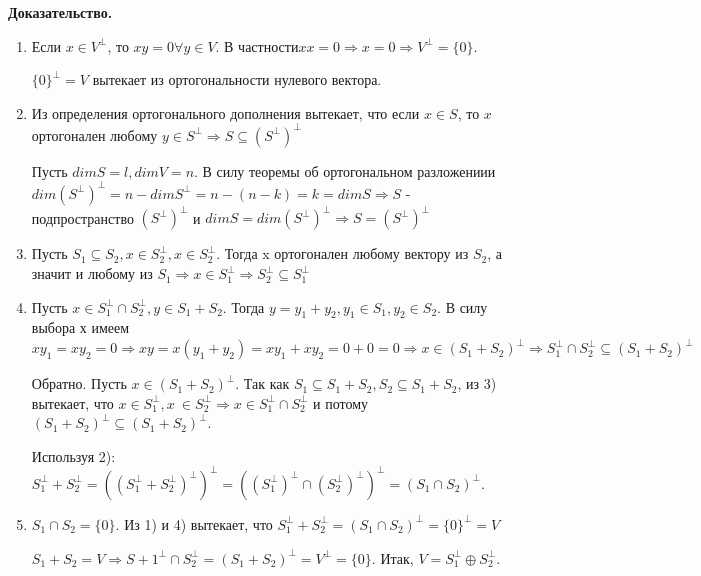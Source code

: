 \documentclass[a4paper]{article}
\begin{document}
    \begin{hproof}
        \textbf{Доказательство.}
        \begin{enumerate}
            \item Если $x \in V^{\bot}$, то $xy = 0 \forall y \in V$. В частности$xx = 0\Rightarrow x = 0 \Rightarrow V^{\bot} = \{ 0 \}$.

            $\{ 0 \}^{\bot} = V$ вытекает из ортогональности нулевого вектора.

            \item Из определения ортогонального дополнения вытекает, что если $x \in S$, то $x$ ортогонален любому $y \in S^{\bot} \Rightarrow S \subseteq (S^{\bot})^{\bot}$

            Пусть $dimS = l, dimV = n$. В силу теоремы об ортогональном разложениии $dim (S^{\bot})^{\bot} = n - dim S^{\bot} = n-(n-k) = k = dimS \Rightarrow S$ - подпространство $(S^{\bot})^{\bot}$ и $dimS = dim (S^{\bot})^{\bot} \Rightarrow S = (S^{\bot})^{\bot}$

            \item Пусть $S_1 \subseteq S_2, x \in S_2^{\bot}, x \in S_2^{\bot}$. Тогда x ортогонален любому вектору из $S_2$, а значит и любому из $S_1 \Rightarrow x \in S_1^{\bot} \Rightarrow S_2^{\bot} \subseteq S_1^{\bot}$

            \item Пусть $x \in S_1^{\bot} \cap S_2^{\bot}, y \in S_1+S_2$. Тогда $y=y_1+y_2, y_1 \in S_1, y_2 \in S_2$. В силу выбора х имеем $xy_1 = xy_2 = 0 \Rightarrow xy = x(y_1+y_2) = xy_1 + xy_2 = 0+0=0 \Rightarrow x \in (S_1 + S_2)^{\bot} \Rightarrow S_1^{\bot} \cap S_2^{\bot} \subseteq (S_1+S_2)^{\bot}$



            Обратно. Пусть $x \in (S_1+S_2)^{\bot}$. Так как $S_1 \subseteq S_1+S_2, S_2 \subseteq S_1+S_2$, из 3) вытекает, что $x \in S_1^{\bot}, x\ \in S_2^{\bot} \Rightarrow x \in S_1^{\bot} \cap S_2^{\bot}$ и потому $(S_1 + S_2)^{\bot} \subseteq (S_1+S_2)^{\bot}$.

            Используя 2): $S_1^{\bot} + S_2^{\bot} = ((S_1^{\bot} + S_2^{\bot})^{\bot})^{\bot} = ((S_1^{\bot})^{\bot} \cap (S_2^{\bot})^{\bot})^{\bot} = (S_1 \cap S_2)^{\bot}$.

            \item $S_1 \cap S_2 = \{ 0 \}$. Из 1) и 4) вытекает, что $S_1^{\bot} + S_2^{\bot} = (S_1 \cap S_2)^{\bot} = \{ 0 \}^{\bot} = V$

            $S_1+S_2 = V \Rightarrow S+1^{\bot} \cap S_2^{\bot} = (S_1 + S_2)^{\bot} = V^{\bot} = \{ 0 \}$. Итак, $V = S_1^{\bot} \oplus S_2^{\bot}$.
        \end{enumerate}
    \end{hproof}
    
\end{document}
